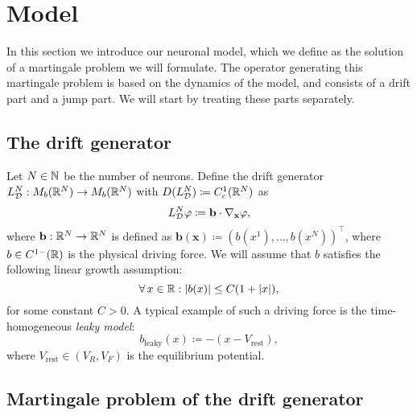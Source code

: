 \section{Model}

In this section we introduce our neuronal model, which we define as the solution of a martingale problem we will formulate.
The operator generating this martingale problem is based on the dynamics of the model, and consists of a drift part and a jump part.
We will start by treating these parts separately.

\subsection{The drift generator}

Let \( N \in \mathbb{N} \) be the number of neurons.
Define the drift generator \(L_{\mathcal{D}}^{N} : M_b(\mathbb{R}^N) \to M_b(\mathbb{R}^N)\) with \(D(L_{\mathcal{D}}^N) \coloneqq C_c^1(\mathbb{R}^N)\) as
\begin{equation}
  L_{\mathcal{D}}^{N}\varphi \coloneqq \mathbf{b} \cdot \nabla_{\mathbf{x}} \varphi,
\end{equation}
where \(\mathbf{b} : \mathbb{R}^N \to \mathbb{R}^N\) is defined as \( \bm{b}(\bm{x}) \coloneqq (b(x^1), \dots, b(x^N))^\top \), where \(b \in C^{1-}(\mathbb{R})\) is the physical driving force.
We will assume that \(b\) satisfies the following linear growth assumption:
\begin{equation}
  \forall x \in \potspace : \abs{b(x)} \leq C (1 + \abs{x}),
\end{equation}
for some constant \(C > 0\).
\newline
A typical example of such a driving force is the time-homogeneous \textit{leaky model}:
\begin{equation}
  b_{\mathrm{leaky}}(x) \coloneqq -(x - V_\mathrm{rest}),
\end{equation}
where \(V_\mathrm{rest} \in (V_R, V_F)\) is the equilibrium potential.

\subsection{Martingale problem of the drift generator}

